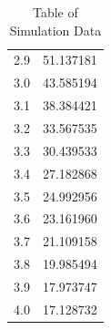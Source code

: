 \documentclass[a4paper]{article}
\numberwithin{equation}{section}
\begin{document}
\begin{table}[ht]
{\begin{tabular}[t]{cc}
			2.9 & 51.137181 \\
			3.0 & 43.585194 \\
			3.1 & 38.384421 \\
			3.2 & 33.567535 \\
			3.3 & 30.439533 \\
			3.4 & 27.182868 \\
			3.5 & 24.992956 \\
			3.6 & 23.161960 \\
			3.7 & 21.109158 \\
			3.8 & 19.985494 \\
			3.9 & 17.973747 \\
			4.0 & 17.128732 \\
			\hline
	\end{tabular}}
	\caption{Table of Simulation Data}
\end{table}
\end{document}
